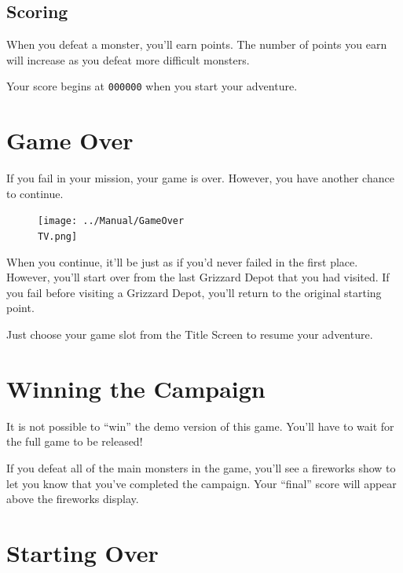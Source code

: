 \documentclass[10pt,twocolumn,openany,article]{memoir}
\newcommand\TV{NTSC}
\newcommand\TV{PAL}
\newcommand\TV{SECAM}
\begin{document}
\begin{description}
\subsection{Scoring}

When you  defeat a monster, you'll  earn points. The number  of points
you earn will increase as you defeat more difficult monsters.

Your score begins at \texttt{000000} when you start your adventure.

\section{Game Over}

If  you fail  in your  mission,  your game  is over.  However, you  have
another chance to continue.

\begin{figure}[b]
  \begin{center}
    \texttt{[image: ../Manual/GameOver\\TV.png]}
  \end{center}
\end{figure}

When you continue, it'll  be just as if you'd never  failed in the first
place. However, you'll start over from  the last Grizzard Depot that you
had visited. If you fail before visiting a Grizzard Depot, you'll return
to the original starting point.

Just  choose   your  game   slot  from  the   Title  Screen   to  resume
your adventure.

\section{Winning the Campaign}\label{Winning the Campaign}

\ifdefined\DEMO

It is not possible to ``win'' the demo version of this game. You'll have
to wait for the full game to be released!

\else

If  you  defeat  all of  the  main  monsters  in  the game,  you'll  see
a fireworks  show to let  you know  that you've completed  the campaign.
Your ``final'' score will appear above the fireworks display.

\fi

\section{Starting Over}\label{Starting Your Adventure Over}


\end{description}
\end{document}

